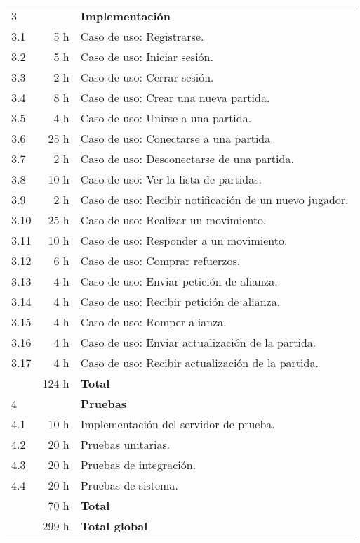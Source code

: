 \begin{longtable}[c]{lrl}
3 & & \textbf{Implementación} \\
3.1  &  5 h & Caso de uso: Registrarse. \\
3.2  &  5 h & Caso de uso: Iniciar sesión. \\
3.3  &  2 h & Caso de uso: Cerrar sesión. \\
3.4  &  8 h & Caso de uso: Crear una nueva partida. \\
3.5  &  4 h & Caso de uso: Unirse a una partida. \\
3.6  & 25 h & Caso de uso: Conectarse a una partida. \\
3.7  &  2 h & Caso de uso: Desconectarse de una partida. \\
3.8  & 10 h & Caso de uso: Ver la lista de partidas. \\
3.9  &  2 h & Caso de uso: Recibir notificación de un nuevo jugador. \\
3.10 & 25 h & Caso de uso: Realizar un movimiento. \\
3.11 & 10 h & Caso de uso: Responder a un movimiento. \\
3.12 &  6 h & Caso de uso: Comprar refuerzos. \\
3.13 &  4 h & Caso de uso: Enviar petición de alianza. \\
3.14 &  4 h & Caso de uso: Recibir petición de alianza. \\
3.15 &  4 h & Caso de uso: Romper alianza. \\
3.16 &  4 h & Caso de uso: Enviar actualización de la partida. \\
3.17 &  4 h & Caso de uso: Recibir actualización de la partida. \\
    & 124 h & \textbf{Total} \\
\hline

4 & & \textbf{Pruebas} \\
4.1 & 10 h & Implementación del servidor de prueba. \\
4.2 & 20 h & Pruebas unitarias. \\
4.3 & 20 h & Pruebas de integración. \\
4.4 & 20 h & Pruebas de sistema. \\
    & 70 h & \textbf{Total} \\
\hline
   & 299 h & \textbf{Total global} \\
\hline
\end{longtable}
